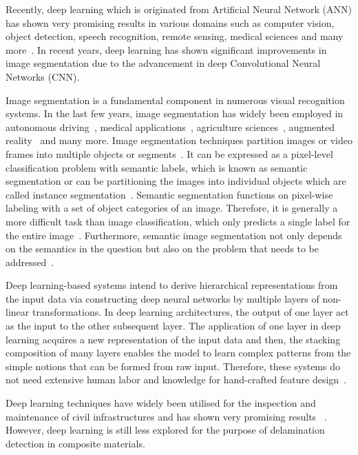 Recently, deep learning which is originated from Artificial Neural Network (ANN) has shown very promising results in various domains such as computer vision, object detection, speech recognition, remote sensing, medical sciences and many more~\cite{deng2014deep, mohanty2016using, zhang2020well, pashaei2020review}. 
In recent years, deep learning has shown significant improvements in image segmentation due to the advancement in deep Convolutional Neural Networks (CNN). 

Image segmentation is a fundamental component in numerous visual recognition systems. In the last few years, image segmentation has widely been employed in autonomous driving~\cite{zhang2013understanding, cordts2016cityscapes, ros2016synthia, li2018real}, medical applications~\cite{taghanaki2020deep}, agriculture sciences~\cite{milioto2018real}, augmented reality~\cite{miksik2015semantic} and many more. 
Image segmentation techniques partition images or video frames into multiple objects or segments~\cite{szeliski2010computer}. 
It can be expressed as a pixel-level classification problem with semantic labels, which is known as semantic segmentation or can be partitioning the images into individual objects which are called instance segmentation~\cite{minaee2020image}. 
Semantic segmentation functions on pixel-wise labeling with a set of object categories of an image. 
Therefore, it is generally a more difficult task than image classification, which only predicts a single label for the entire image~\cite{minaee2020image}. 
Furthermore, semantic image segmentation not only depends on the semantics in the question but also on the problem that needs to be addressed~\cite{ghosh2019understanding}.

Deep learning-based systems intend to derive hierarchical representations from the input data via constructing deep neural networks by multiple layers of non-linear transformations. 
In deep learning architectures, the output of one layer act as the input to the other subsequent layer. 
The application of one layer in deep learning acquires a new representation of the input data and then, the stacking composition of many layers enables the model to learn complex patterns from the simple notions that can be formed from raw input. 
Therefore, these systems do not need extensive human labor and knowledge for hand-crafted feature design~\cite{zhao2019deep, yuan2020machine}.

Deep learning techniques have widely been utilised for the inspection and maintenance of civil infrastructures and has shown very promising results ~\cite{cha2017deep, lin2017structural, liu2019computer}. 
However, deep learning is still less explored for the purpose of delamination detection in composite materials.   

